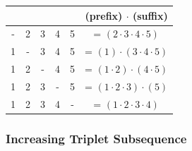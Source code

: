 \documentclass[10pt,a4paper]{article}
\begin{document}
\begin{itemize}
    \begin{center}
        \begin{tabular}{c|c|c|c|c|c}
             &  &  &  &  &  (prefix) $\cdot$ (suffix) \\
             \hline
            - & 2 & 3 & 4 & 5 & = $(2 \cdot 3 \cdot 4 \cdot 5)$\\
            \hline
            1 & - & 3 & 4 & 5 & = $(1) \cdot (3 \cdot 4 \cdot 5)$ \\
            \hline
            1 & 2 & - & 4 & 5 & = $(1 \cdot 2) \cdot  (4 \cdot 5)$ \\
            \hline
            1 & 2 & 3 & - & 5 & = $(1 \cdot 2 \cdot 3) \cdot (5)$ \\
            \hline
            1 & 2 & 3 & 4 & - & = $(1 \cdot 2 \cdot 3 \cdot 4)$ \\
        \end{tabular}
    \end{center}
\end{itemize}



\subsubsection*{Increasing Triplet Subsequence}
\end{document}
